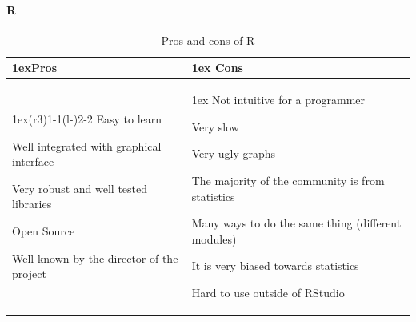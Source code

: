 \documentclass{article}
\begin{document}
        \paragraph{R}
        \begin{table}[H]
        \begin{tabularx}{\linewidth}{>{\parskip1ex}X@{\kern4\tabcolsep}>{\parskip1ex}X}
        \toprule
        \hfil\bfseries Pros
        &
        \hfil\bfseries Cons
        \\\cmidrule(r{3\tabcolsep}){1-1}\cmidrule(l{-\tabcolsep}){2-2}
        Easy to learn\par
        Well integrated with graphical interface\par
        Very robust and well tested libraries\par
        Open Source\par
        Well known by the director of the project\par
        &
        Not intuitive for a programmer\par
        Very slow\par
        Very ugly graphs\par
        The majority of the community is from statistics\par
        Many ways to do the same thing (different modules)\par
        It is very biased towards statistics\par
        Hard to use outside of RStudio\par
        \\\bottomrule
        \end{tabularx}
        \caption{Pros and cons of R}
        \end{table}
\end{document}

